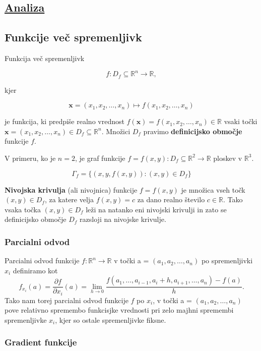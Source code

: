 \documentclass{article}
\begin{document}
\begin{multicols}{2}
\section{\underline{Analiza}}

\subsection{Funkcije več spremenljivk}
Funkcija več spremenljivk

\[
    f : D_f \subseteq \mathbb{R}^n \to \mathbb{R},
\]

kjer

\[
    \mathbf{x} = (x_1, x_2, \ldots, x_n) \mapsto f(x_1, x_2, \ldots, x_n)
\]

je funkcija, ki predpiše realno vrednost $f(\mathbf{x}) = f(x_1, x_2, \ldots, x_n) \in \mathbb{R}$ vsaki točki $\mathbf{x} = (x_1, x_2, \ldots, x_n) \in D_f \subseteq \mathbb{R}^n$. Množici $D_f$ pravimo \textbf{definicijsko območje} funkcije $f$.

V primeru, ko je $n = 2$, je graf funkcije $f = f(x, y): D_f \subseteq \mathbb{R}^2 \to \mathbb{R}$ ploskev v $\mathbb{R}^3$.

\[
    \Gamma_f = \{ (x, y, f(x, y)) : (x, y) \in D_f \}
\]

\textbf{Nivojska krivulja} (ali nivojnica) funkcije $f = f(x, y)$ je množica vseh točk $(x, y) \in D_f$, za katere velja $f(x, y) = c$ za dano realno število $c \in \mathbb{R}$. Tako vsaka točka $(x, y) \in D_f$ leži na natanko eni nivojski krivulji in zato se definicijsko območje $D_f$ razsloji na nivojske krivulje.

\subsubsection{Parcialni odvod}
Parcialni odvod funkcije \( f: \mathbb{R}^n \rightarrow \mathbb{R} \) v točki a = \( (a_1, a_2, \ldots, a_n) \) po spremenljivki \( x_i \) definiramo kot
\[
f_{x_i}(a) = \frac{\partial f}{\partial x_i}(a) = \lim_{h \to 0} \frac{f(a_1, \ldots, a_{i-1}, a_i + h, a_{i+1}, \ldots, a_n) - f(a)}{h}.
\]
Tako nam torej parcialni odvod funkcije \( f \) po \( x_i \), v točki a = \( (a_1, a_2, \ldots, a_n) \) pove relativno spremembo funkcisjke vrednosti pri zelo majhni spremembi spremenljivke \( x_i \), kjer so ostale spremenljivke fiksne.


\subsubsection{Gradient funkcije}


\end{multicols}
\end{document}
